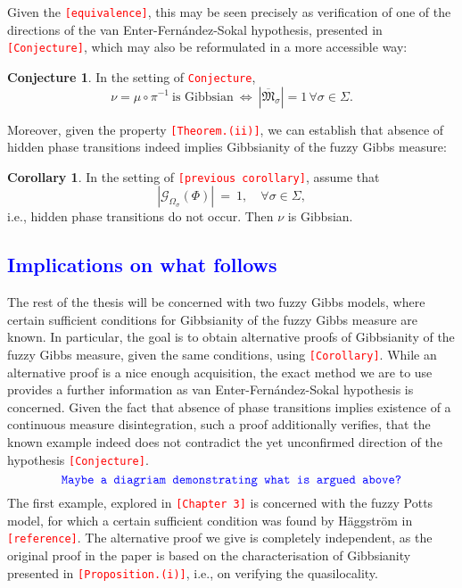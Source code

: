 \documentclass[12pt]{article}
\newcommand{\G}{\mathcal{G}}
\newcommand{\MM}{\mathfrak{M}}
\newcommand{\1}{\mathbbm{1}}
\newcommand{\5}{\vspace{0.5cm}}
\theoremstyle{definition}
\newtheorem{cor}[thm]{Corollary}
\newtheorem{conj}[thm]{Conjecture}
\begin{document}
Given the \textcolor{red}{\texttt{[equivalence]}}, this may be seen precisely as verification of one of the directions of the van Enter-Fern\'andez-Sokal hypothesis, presented in \textcolor{red}{\texttt{[Conjecture]}}, which may also be reformulated in a more accessible way:
\begin{conj}
In the setting of \textcolor{red}{\texttt{Conjecture}},
$$\nu=\mu\circ\pi^{-1}~\text{is Gibbsian}~\iff~|\overline{\MM}_\sigma|=1\,\forall \sigma\in\Sigma.$$
\end{conj}

Moreover, given the property \textcolor{red}{\texttt{[Theorem.(ii)]}}, we can establish that absence of hidden phase transitions indeed implies Gibbsianity of the fuzzy Gibbs measure:
\begin{cor}
In the setting of \textcolor{red}{\texttt{[previous corollary]}}, assume that 
$$|\G_{\Omega_\sigma}(\Phi)| ~=~ 1, \quad \forall \sigma\in\Sigma,$$
i.e., hidden phase transitions do not occur. Then $\nu$ is Gibbsian.
\end{cor}


\subsection{\textcolor{blue}{Implications on what follows}}

The rest of the thesis will be concerned with two fuzzy Gibbs models, where certain sufficient conditions for Gibbsianity of the fuzzy Gibbs measure are known. In particular, the goal is to obtain alternative proofs of Gibbsianity of the fuzzy Gibbs measure, given the same conditions, using \textcolor{red}{\texttt{[Corollary]}}. While an alternative proof is a nice enough acquisition, the exact method we are to use provides a further information as van Enter-Fern\'andez-Sokal hypothesis is concerned. Given the fact that absence of phase transitions implies existence of a continuous measure disintegration, such a proof additionally verifies, that the known example indeed does not contradict the yet unconfirmed direction of the hypothesis \textcolor{red}{\texttt{[Conjecture]}}.
$$\textcolor{blue}{\texttt{Maybe a diagriam demonstrating what is argued above?}}$$
The first example, explored in \textcolor{red}{\texttt{[Chapter 3]}} is concerned with the fuzzy Potts model, for which a certain sufficient condition was found by H\"aggstr\"om in \textcolor{red}{\texttt{[reference]}}. The alternative proof we give is completely independent, as the original proof in the paper is based on the characterisation of Gibbsianity presented in \textcolor{red}{\texttt{[Proposition.(i)]}}, i.e., on verifying the quasilocality. \\
\end{document}
